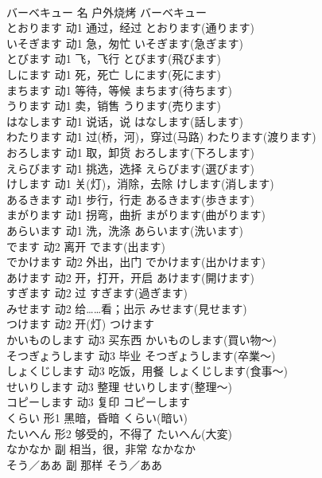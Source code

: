 \documentclass[8pt]{extreport}
\begin{document}
\begin{CJK}{UTF8}{min}
\\	バーベキュー	名	户外烧烤	バーベキュー	
\\	とおります	动1	通过，经过	とおります(通ります)	
\\	いそぎます	动1	急，匆忙	いそぎます(急ぎます)	
\\	とびます	动1	飞，飞行	とびます(飛びます)	
\\	しにます	动1	死，死亡	しにます(死にます)	
\\	まちます	动1	等待，等候	まちます(待ちます)	
\\	うります	动1	卖，销售	うります(売ります)	
\\	はなします	动1	说话，说	はなします(話します)	
\\	わたります	动1	过(桥，河)，穿过(马路)	わたります(渡ります)	
\\	おろします	动1	取，卸货	おろします(下ろします)	
\\	えらびます	动1	挑选，选择	えらびます(選びます)	
\\	けします	动1	关(灯)，消除，去除	けします(消します)	
\\	あるきます	动1	步行，行走	あるきます(歩きます)	
\\	まがります	动1	拐弯，曲折	まがります(曲がります)	
\\	あらいます	动1	洗，洗涤	あらいます(洗います)	
\\	でます	动2	离开	でます(出ます)	
\\	でかけます	动2	外出，出门	でかけます(出かけます)	
\\	あけます	动2	开，打开，开启	あけます(開けます)	
\\	すぎます	动2	过	すぎます(過ぎます)	
\\	みせます	动2	给……看；出示	みせます(見せます)	
\\	つけます	动2	开(灯)	つけます	
\\	かいものします	动3	买东西	かいものします(買い物～)	
\\	そつぎょうします	动3	毕业	そつぎょうします(卒業～)	
\\	しょくじします	动3	吃饭，用餐	しょくじします(食事～)	
\\	せいりします	动3	整理	せいりします(整理～)	
\\	コピーします	动3	复印	コピーします	
\\	くらい	形1	黑暗，昏暗	くらい(暗い)	
\\	たいへん	形2	够受的，不得了	たいへん(大変)	
\\	なかなか	副	相当，很，非常	なかなか	
\\	そう／ああ	副	那样	そう／ああ	

\end{CJK}
\end{document}
